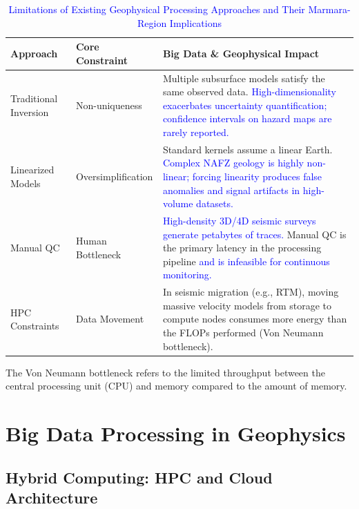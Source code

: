 \documentclass[data,article,submit,pdftex,moreauthors]{Definitions/mdpi}
\begin{document}
\begin{table}[ht]
\centering
\begin{threeparttable}
\caption{\textcolor{blue}{Limitations of Existing Geophysical Processing Approaches and Their Marmara-Region Implications}}
\label{tab01}
\begin{tabularx}{\textwidth}{@{} l l X @{}}
\toprule
\textbf{Approach} & \textbf{Core Constraint} & \textbf{Big Data \& Geophysical Impact} \\ \midrule
Traditional Inversion & Non-uniqueness & Multiple subsurface models satisfy the same observed data. \textcolor{blue}{High-dimensionality exacerbates uncertainty quantification; confidence intervals on hazard maps are rarely reported.} \\ \addlinespace
Linearized Models & Oversimplification & Standard kernels assume a linear Earth. \textcolor{blue}{Complex NAFZ geology is highly non-linear; forcing linearity produces false anomalies and signal artifacts in high-volume datasets.} \\ \addlinespace
Manual QC & Human Bottleneck & \textcolor{blue}{High-density 3D/4D seismic surveys generate petabytes of traces.} Manual QC is the primary latency in the processing pipeline \textcolor{blue}{and is infeasible for continuous monitoring.} \\ \addlinespace
HPC Constraints & Data Movement & In seismic migration (e.g., RTM), moving massive velocity models from storage to compute nodes consumes more energy than the FLOPs performed (Von Neumann bottleneck\tnote{1}). \\ \bottomrule
\end{tabularx}
\begin{tablenotes}
\small
\item[1] The Von Neumann bottleneck refers to the limited throughput between the central processing unit (CPU) and memory compared to the amount of memory.
\end{tablenotes}
\end{threeparttable}
\end{table}

\section{Big Data Processing in Geophysics}

\subsection{Hybrid Computing: HPC and Cloud Architecture}
\end{document}
